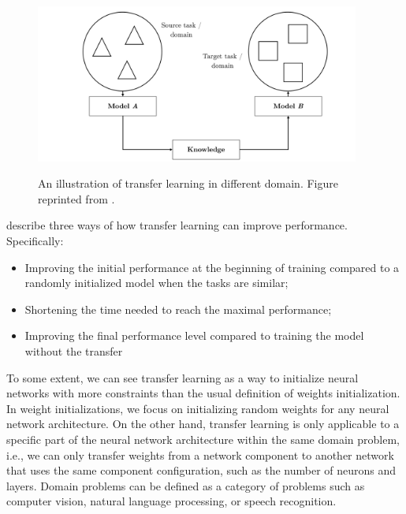\begin{figure}[h]
    {\includegraphics[width=0.95\textwidth]{img/transfer_learning_scenario.png}}
    \centering
    \caption{An illustration of transfer learning in different domain. Figure reprinted from .}
    \label{img:transfer_learning}
\end{figure}

 describe three ways of how transfer learning can improve performance. Specifically:
\begin{itemize}
    \item Improving the initial performance at the beginning of training compared
          to a randomly initialized model when the tasks are similar;
    \item Shortening the time needed to reach the maximal performance;
    \item Improving the final performance level compared to training the model
          without the transfer
\end{itemize}

To some extent, we can see transfer learning as a way to initialize neural networks with more constraints than the usual definition of weights initialization. In weight initializations, we focus on initializing random weights for any neural network architecture. On the other hand, transfer learning is only applicable to a specific part of the neural network architecture within the same domain problem, i.e., we can only transfer weights from a network component to another network that uses the same component configuration, such as the number of neurons and layers. Domain problems can be defined as a category of problems such as computer vision, natural language processing, or speech recognition.

